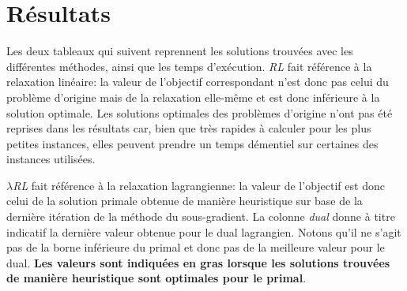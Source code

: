 \section{Résultats}

Les deux tableaux qui suivent reprennent les solutions trouvées avec les différentes méthodes,
ainsi que les temps d'exécution. \textit{RL} fait référence à la relaxation linéaire:
la valeur de l'objectif correspondant n'est donc pas celui du problème d'origine mais de la
relaxation elle-même et est donc inférieure à la solution optimale.
Les solutions optimales des problèmes d'origine n'ont pas été reprises dans les résultats car, bien
que très rapides à calculer pour les plus petites instances, elles peuvent prendre un temps
démentiel sur certaines des instances utilisées.

\textit{$\lambda$RL} fait référence à la relaxation lagrangienne: la valeur de l'objectif est donc
celui de la solution primale obtenue de manière heuristique sur base de la dernière itération
de la méthode du sous-gradient. La colonne \textit{dual} donne à titre indicatif la dernière valeur obtenue
pour le dual lagrangien. Notons qu'il ne s'agit pas de la borne inférieure du primal et donc pas de la
meilleure valeur pour le dual. \textbf{Les valeurs sont indiquées en gras lorsque les solutions trouvées de manière heuristique sont optimales pour le primal}.

